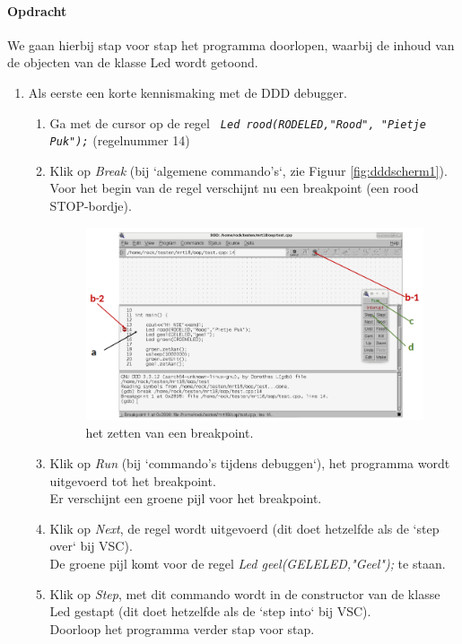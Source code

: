 \paragraph{Opdracht}
We gaan hierbij stap voor stap het programma doorlopen, waarbij de inhoud van de objecten van de klasse Led wordt getoond.

\begin{enumerate} [label=\alph*]
	\item Als eerste een korte kennismaking met de DDD debugger.
\begin{enumerate} [label=\roman*]

	\item Ga met de cursor op de regel \texttt{\textit{ Led rood(RODELED,"Rood", "Pietje Puk");}}
	(regelnummer 14)
	\item Klik op \textit{Break} (bij `algemene commando's`, zie Figuur \ref{fig:dddscherm1}). Voor het begin van de regel verschijnt nu een breakpoint (een rood STOP-bordje).

\begin{figure}[h!]
	\captionsetup{justification=centering}
	\includegraphics[width=0.7 \linewidth]{figuren/ddd_set_breakpoint}
	\centering
	\caption{het zetten van een breakpoint.}
	\label{fig:ddduitv1}
\end{figure}
	\item Klik op \textit{Run} (bij `commando's tijdens debuggen`),
het programma wordt uitgevoerd tot het breakpoint. \\Er verschijnt een groene pijl voor het breakpoint.
\item Klik op \textit{Next}, de regel wordt uitgevoerd (dit doet hetzelfde als de `step over` bij VSC). \\
De groene pijl komt voor de regel \textit{Led geel(GELELED,"Geel");} te staan. 
\item Klik op \textit{Step}, met dit commando wordt in de constructor van de klasse Led gestapt (dit doet hetzelfde als de `step into` bij VSC). \\Doorloop het programma verder stap voor stap.


\end{enumerate}
\end{enumerate}
